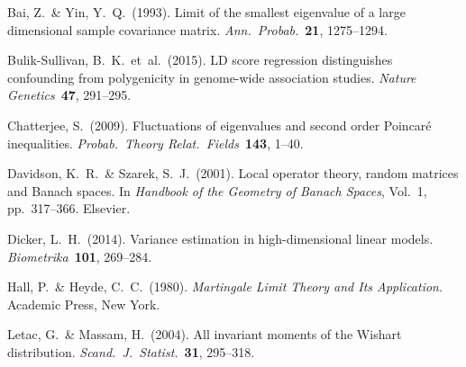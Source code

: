 \documentclass[11pt]{article}
\begin{document}
\begin{description}[leftmargin=0pt,itemsep=6pt]
\item[] Bai, Z.\ \& Yin, Y.\ Q.\ (1993). Limit of the smallest eigenvalue of
  a large dimensional sample covariance matrix.
  \textit{Ann.\ Probab.}\ \textbf{21}, 1275--1294.

\item[] Bulik-Sullivan, B.\ K.\ et~al.\ (2015). LD score regression
  distinguishes confounding from polygenicity in genome-wide association
  studies. \textit{Nature Genetics}\ \textbf{47}, 291--295.

\item[] Chatterjee, S.\ (2009). Fluctuations of eigenvalues and second order
  Poincar\'e inequalities. \textit{Probab.\ Theory Relat.\ Fields}\
  \textbf{143}, 1--40.

\item[] Davidson, K.\ R.\ \& Szarek, S.\ J.\ (2001). Local operator theory,
  random matrices and Banach spaces. In \textit{Handbook of the Geometry of
  Banach Spaces}, Vol.~1, pp.~317--366. Elsevier.

\item[] Dicker, L.\ H.\ (2014). Variance estimation in high-dimensional
  linear models. \textit{Biometrika}\ \textbf{101}, 269--284.

\item[] Hall, P.\ \& Heyde, C.\ C.\ (1980). \textit{Martingale Limit Theory
  and Its Application}. Academic Press, New York.

\item[] Letac, G.\ \& Massam, H.\ (2004). All invariant moments of the
  Wishart distribution. \textit{Scand.\ J.\ Statist.}\ \textbf{31}, 295--318.
\end{description}
\end{document}
